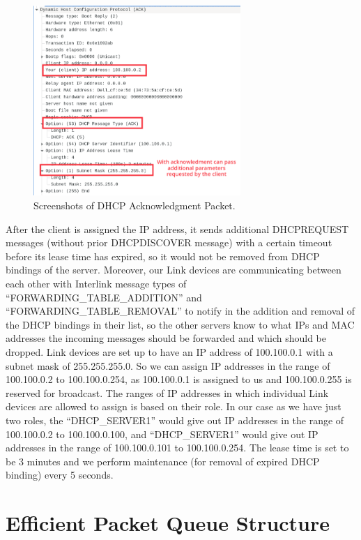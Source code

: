 \begin{figure}[htp]
\begin{center}
\includegraphics[width=0.7\textwidth]{DHCP-Ack.png}
\end{center}
\caption{Screenshots of DHCP Acknowledgment Packet.}
\label{dhcp-ack}
\end{figure}

\newpage

After the client is assigned the IP address, it sends additional DHCPREQUEST messages (without prior DHCPDISCOVER message) with a certain timeout before its lease time has expired, so it would not be removed from DHCP bindings of the server. Moreover, our Link devices are communicating between each other with Interlink message types of “FORWARDING\_TABLE\_ADDITION” and “FORWARDING\_TABLE\_REMOVAL” to notify in the addition and removal of the DHCP bindings in their list, so the other servers know to what IPs and MAC addresses the incoming messages should be forwarded and which should be dropped. 
Link devices are set up to have an IP address of 100.100.0.1 with a subnet mask of 255.255.255.0.  So we can assign IP addresses in the range of 100.100.0.2 to 100.100.0.254, as 100.100.0.1 is assigned to us and 100.100.0.255 is reserved for broadcast. The ranges of IP addresses in which individual Link devices are allowed to assign is based on their role. In our case as we have just two roles, the “DHCP\_SERVER1” would give out IP addresses in the range of 100.100.0.2 to 100.100.0.100, and “DHCP\_SERVER1” would give out IP addresses in the range of 100.100.0.101 to 100.100.0.254. The lease time is set to be 3 minutes and we perform maintenance (for removal of expired DHCP binding) every 5 seconds. 

\section{Efficient Packet Queue Structure}

